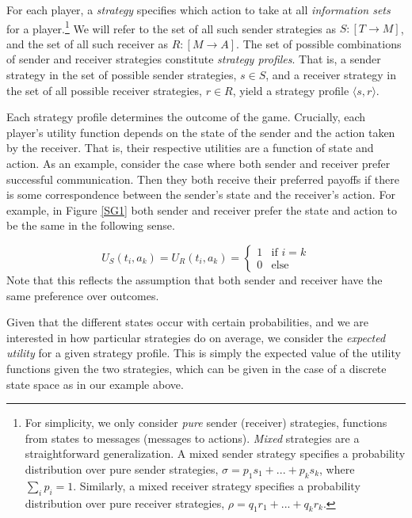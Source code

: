 \documentclass[12pt]{article}
\theoremstyle{definition} \newtheorem{definition}{Definition}
\begin{document}
For each player, a \emph{strategy} specifies which action to take at all \emph{information sets} for a player.\footnote{For simplicity, we only consider \emph{pure} sender (receiver) strategies, functions from states to messages (messages to actions). \emph{Mixed} strategies are a straightforward generalization. A mixed sender strategy specifies a probability distribution over pure sender strategies, $\sigma = p_1 s_1 + ... + p_k s_k$, where $\sum_i p_i = 1$. Similarly, a mixed receiver strategy specifies a probability distribution over pure receiver strategies, $\rho = q_1 r_1 + ... + q_k r_k$.} We will refer to the set of all such sender strategies as $S : [T \rightarrow M ]$, and the set of all such receiver as $R : [M \rightarrow A]$. The set of possible combinations of sender and receiver strategies constitute \emph{strategy profiles}. That is, a sender strategy in the set of possible sender strategies, $s \in S$, and a receiver strategy in the set of all possible receiver strategies, $r  \in R$, yield 
a strategy profile $\langle s,r \rangle$.

Each strategy profile determines the outcome of the game. Crucially, each player's utility function depends on the state of the sender and the action taken by the receiver. That is, their respective utilities are a function of state and action. As an example, consider the case where both sender and receiver prefer successful communication. Then they both receive their preferred payoffs if there is some correspondence between the sender's state and the receiver's action. For example, in Figure \ref{SG1} both sender and receiver prefer the state and action to be the same in the following sense.

\begin{equation}
 U_{S}(t_i, a_k) = U_{R}(t_i, a_k) =
\left\{
	\begin{array}{ll}
		1  & \mbox{if } i = k \\
		0 & \mbox{else}
	\end{array}
\right.
\end{equation}
Note that this reflects the assumption that both sender and receiver have the same preference over outcomes.

Given that the different states occur with certain probabilities, and we are interested in how particular strategies do on average, we consider the \emph{expected utility} for a given strategy profile. This is simply the expected value of the utility functions given the two strategies, which can be given in the case of a discrete state space as in our example above.
\end{document}
